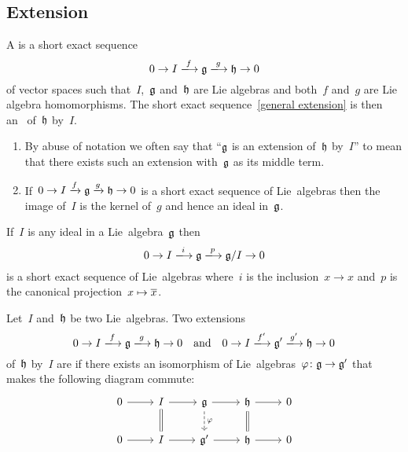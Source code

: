 \subsection{Extension}


\begin{definition}
  A  is a short exact sequence
  \begin{equation}
    \label{general extension}
    0 
    \to
    I
    \xlongto{f}
    \glie
    \xlongto{g}
    \hlie
    \to
    0
  \end{equation}
  of vector spaces such that~$I$,~$\mathfrak{g}$ and~$\mathfrak{h}$ are Lie algebras and both~$f$ and~$g$ are Lie algebra homomorphisms.
  The short exact sequence~\eqref{general extension} is then an~ of~$\mathfrak{h}$ by~$I$.
\end{definition}


\begin{remark}
  \leavevmode
  \begin{enumerate}
    \item
      By abuse of notation we often say that \enquote{$\mathfrak{g}$ is an extension of~$\mathfrak{h}$ by~$I$} to mean that there exists such an extension with~$\mathfrak{g}$ as its middle term.
    \item
      If~$0 \to I \xrightarrow{f} \mathfrak{g} \xrightarrow{g} \mathfrak{h} \to 0$ is a short exact sequence of Lie~algebras then the image of~$I$ is the kernel of~$g$ and hence an ideal in~$\mathfrak{g}$.
  \end{enumerate}
\end{remark}


\begin{example}
  If~$I$ is any ideal in a Lie~algebra~$\mathfrak{g}$ then
  \[
    0
    \to
    I
    \xlongto{i}
    \glie
    \xlongto{p}
    \glie/I
    \to
    0
  \]
  is a short exact sequence of Lie~algebras where~$i$ is the inclusion~$x \to x$ and~$p$ is the canonical projection~$x \mapsto \overline{x}$.
\end{example}


\begin{definition}
  \label{equivalence of extensions}
  Let~$I$ and~$\mathfrak{h}$ be two Lie~algebras.
  Two extensions
  \[
    0 
    \to
    I
    \xlongto{f}
    \glie
    \xlongto{g}
    \hlie
    \to
    0
    \quad\text{and}\quad
    0 
    \to
    I
    \xlongto{f'}
    \glie'
    \xlongto{g'}
    \hlie
    \to
    0
  \]
  of~$\mathfrak{h}$ by~$I$ are  if there exists an isomorphism of Lie~algebras~$\varphi \colon \mathfrak{g} \to \mathfrak{g}'$ that makes the following diagram commute:
  \[
    \begin{tikzcd}
      0
      \arrow{r}
      &
      I
      \arrow{r}
      \arrow[equal]{d}
      &
      \glie
      \arrow{r}
      \arrow[dashed]{d}[right]{\varphi}
      &
      \hlie
      \arrow{r}
      \arrow[equal]{d}
      &
      0
      \\
      0
      \arrow{r}
      &
      I
      \arrow{r}
      &
      \glie'
      \arrow{r}
      &
      \hlie
      \arrow{r}
      &
      0
    \end{tikzcd}
  \]
\end{definition}



